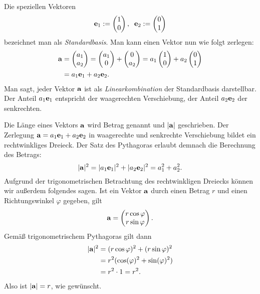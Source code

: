 Die speziellen Vektoren
\[
\mathbf{e}_1 := \begin{pmatrix}1\\ 0\end{pmatrix},\;\;
\mathbf{e}_2 := \begin{pmatrix}0\\ 1\end{pmatrix}
\]
bezeichnet man als \emph{Standardbasis}. Man kann einen
Vektor nun wie folgt zerlegen:%
\begin{align*}
\mathbf{a} &= \begin{pmatrix}a_1\\ a_2\end{pmatrix}
= \begin{pmatrix}a_1\\ 0\end{pmatrix}
+ \begin{pmatrix}0\\ a_2\end{pmatrix}
= a_1\begin{pmatrix}1\\ 0\end{pmatrix}
+ a_2\begin{pmatrix}0\\ 1\end{pmatrix}\\
&= a_1\mathbf{e}_1+a_2\mathbf{e}_2.
\end{align*}
Man sagt, jeder Vektor $\mathbf{a}$ ist als \emph{Linearkombination}
der Standardbasis darstellbar. Der Anteil $a_1\mathbf{e}_1$
entspricht der waagerechten Verschiebung, der Anteil
$a_2\mathbf{e}_2$ der senkrechten.

Die Länge eines Vektors $\mathbf{a}$ wird Betrag
genannt und $|\mathbf{a}|$ geschrieben. Der Zerlegung
$\mathbf{a}=a_1\mathbf{e}_1+a_2\mathbf{e}_2$ in waagerechte und
senkrechte Verschiebung bildet ein rechtwinkliges Dreieck. Der Satz des
Pythagoras erlaubt demnach die Berechnung des Betrags:%
\[|\mathbf{a}|^2 = |a_1\mathbf{e}_1|^2+|a_2\mathbf{e}_2|^2 = a_1^2+a_2^2.\]
Aufgrund der trigonometrischen Betrachtung des rechtwinkligen
Dreiecks können wir außerdem folgendes sagen. Ist ein Vektor $\mathbf{a}$
durch einen Betrag $r$ und einen Richtungswinkel $\varphi$ gegeben,
gilt%
\[\mathbf{a} = \begin{pmatrix}
r\cos\varphi\\
r\sin\varphi
\end{pmatrix}.\]
Gemäß trigonometrischem Pythagoras gilt dann%
\begin{align*}
|\mathbf{a}|^2 &= (r\cos\varphi)^2+(r\sin\varphi)^2\\
&= r^2(\cos(\varphi)^2+\sin(\varphi)^2)\\
&= r^2\cdot 1 = r^2.
\end{align*}
Also ist $|\mathbf{a}|=r$, wie gewünscht.

